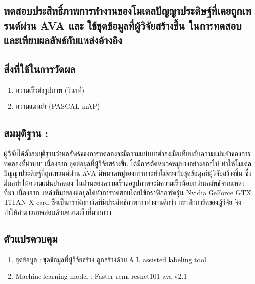 \subsection{ทดสอบประสิทธิ์ภาพการทำงานของโมเดลปัญญาประดิษฐ์ที่เคยถูกเทรนด์ผ่าน AVA และ ใช้ชุดข้อมูลที่ผู้วิจัยสร้างขึ้น ในการทดสอบและเทียบผลลัพธ์กับแหล่งอ้างอิง}
\subsection*{สิ่งที่ใช้ในการวัดผล}
	\begin{enumerate}
		\item ความเร็วต่อรูปภาพ (วินาที)
		\item ความแม่นยำ (PASCAL mAP)
	\end{enumerate}
\subsection*{สมมุติฐาน :}ผู้วิจัยได้ตั้งสมมุติฐานว่าผลลัพธ์ของการทดลองจะมีความแม่นยำต่ำลงเมื่อเทียบกับความแม่นยำของการทดลองที่ผ่านมา เนื่องจาก ชุดข้อมูลที่ผู้วิจัยสร้างขึ้น ได้มีการตัดหมวดหมู่บางอย่างออกไป ทำให้โมเดลปัญญาประดิษฐ์ที่ถูกเทรนด์ผ่าน AVA มีหมวดหมู่ของการกระทำไม่ตรงกับชุดข้อมูลที่ผู้วิจัยสร้างขึ้น ซึ่งมีผลทำให้ความแม่นยำลดลง ในส่วนของความเร็วต่อรูปภาพจะมีความเร็วน้อยกว่าผลลัพธ์จากแหล่งที่มา เนื่องจาก แหล่งที่มาของข้อมูลได้ทำการทดสอบโดยใช้กราฟิกการ์ดรุ่น Nvidia GeForce GTX TITAN X card ซึ่งเป็นกราฟิกการ์ดที่มีประสิทธิภาพการทำงานดีกว่า กราฟิกการ์ดของผู้วิจัย จึงทำให้สามารถทดสอบด้วยความเร็วที่มากกว่า
\subsection*{ตัวแปรควบคุม}
	\begin{enumerate}
		\item ชุดข้อมูล : ชุดข้อมูลที่ผู้วิจัยสร้าง ถูกสร้างด้วย A.I. assisted labeling tool
		\item Machine learning model : Faster rcnn resnet101 ava v2.1
	\end{enumerate}
